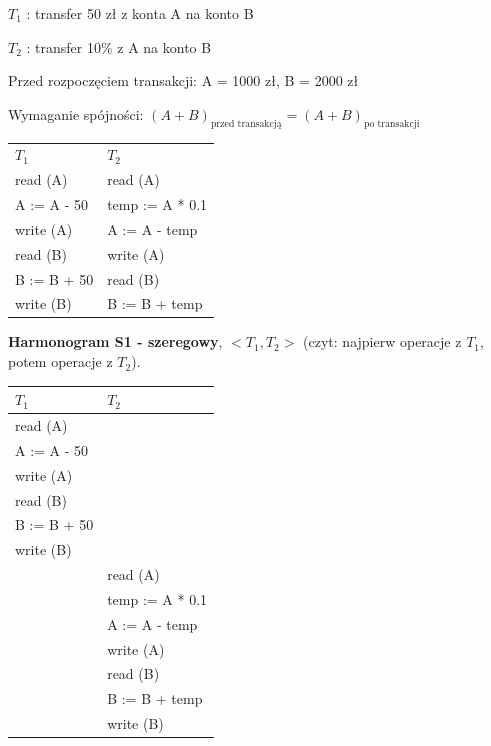 \documentclass[12pt]{article}
\begin{document}
    $T_1$ : transfer 50 zł z konta A na konto B

    $T_2$ : transfer 10\% z A na konto B

    Przed rozpoczęciem transakcji: A = 1000 zł, B = 2000 zł

    Wymaganie spójności: $( A + B )_{\text{przed transakcją}} = ( A + B )_{\text{po transakcji}}$

    \begin{table}[H]
        \begin{center}
            \begin{tabular}{p{8cm} p{8cm}}
                $T_1$ & $T_2$ \\
                read (A) & read (A)\\
                A := A - 50 & temp := A * 0.1\\
                write (A) & A := A - temp\\
                read (B) & write (A)\\
                B := B + 50 & read (B)\\
                write (B) & B := B + temp\\
            \end{tabular}
        \end{center}
    \end{table}

    \newpage

    \noindent \textbf{Harmonogram S1 - szeregowy}, $<T_1, T_2>$ (czyt: najpierw operacje z $T_1$, potem operacje z $T_2$).
    \begin{table}[H]
        \begin{center}
            \begin{tabular}{| p{6cm} | p{6cm} |}
                \hline
                $T_1$ & $T_2$\\
                \hline
                \hline
                read (A) &\\
                \hline
                A := A - 50 &\\
                \hline
                write (A) &\\
                \hline
                read (B) &\\
                \hline
                B := B + 50 &\\
                \hline
                write (B) &\\
                \hline
                & read (A)\\
                \hline
                & temp := A * 0.1\\
                \hline
                & A := A - temp\\
                \hline
                & write (A)\\
                \hline
                & read (B)\\
                \hline
                & B := B + temp\\
                \hline
                & write (B)\\
                \hline
            \end{tabular}
        \end{center}
    \end{table}
\end{document}
